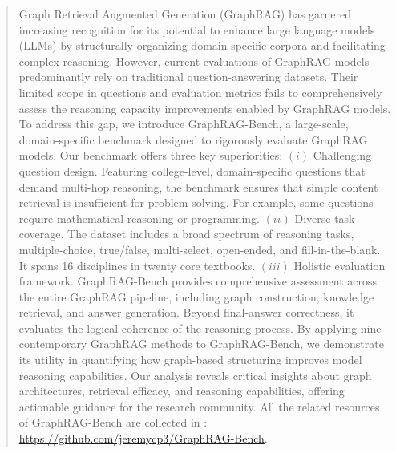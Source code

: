 \documentclass{article}
\begin{document}
\begin{abstract}
Graph Retrieval Augmented Generation (GraphRAG) has garnered increasing recognition for its potential to enhance large language models (LLMs) by structurally organizing domain-specific corpora and facilitating complex reasoning. However, current evaluations of GraphRAG models predominantly rely on traditional question-answering datasets. Their limited scope in questions and evaluation metrics fails to comprehensively assess the reasoning capacity improvements enabled by GraphRAG models. To address this gap, we introduce GraphRAG-Bench, a large-scale, domain-specific benchmark designed to rigorously evaluate GraphRAG models. Our benchmark offers three key superiorities: \((i)\) Challenging question design. Featuring college-level, domain-specific questions that demand multi-hop reasoning, the benchmark ensures that simple content retrieval is insufficient for problem-solving. For example, some questions require mathematical reasoning or programming. \((ii)\) Diverse task coverage. The dataset includes a broad spectrum of reasoning tasks, multiple-choice, true/false, multi-select, open-ended, and fill-in-the-blank. It spans 16 disciplines in twenty core textbooks. \((iii)\) Holistic evaluation framework. GraphRAG-Bench provides comprehensive assessment across the entire GraphRAG pipeline, including graph construction, knowledge retrieval, and answer generation. Beyond final-answer correctness, it evaluates the logical coherence of the reasoning process. By applying nine contemporary GraphRAG methods to GraphRAG-Bench, we demonstrate its utility in quantifying how graph-based structuring improves model reasoning capabilities. Our analysis reveals critical insights about graph architectures, retrieval efficacy, and reasoning capabilities, offering actionable guidance for the research community. All the related resources of GraphRAG-Bench are collected in \faGithub: \textcolor{blue}{\url{https://github.com/jeremycp3/GraphRAG-Bench}}.





\end{abstract}
\end{document}
